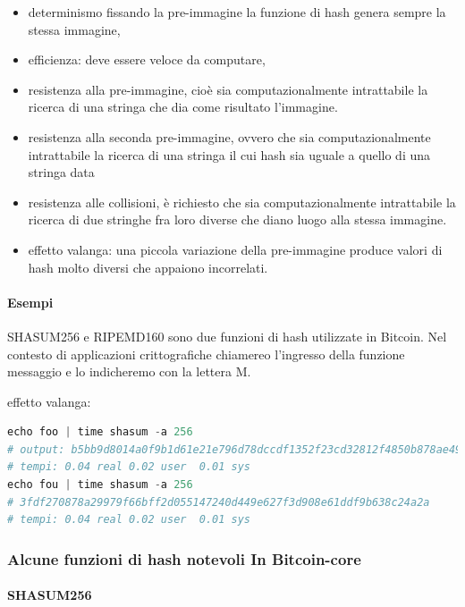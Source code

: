 \documentclass{book}
\theoremstyle{definition}
\begin{document}
\begin{itemize}
    \item determinismo fissando la pre-immagine la funzione di hash genera sempre la stessa immagine,
    \item efficienza: deve essere veloce da computare,
    \item resistenza alla pre-immagine, cioè sia computazionalmente intrattabile la ricerca di una stringa che dia come risultato l'immagine.
    \item resistenza alla seconda pre-immagine, ovvero che sia computazionalmente intrattabile la ricerca di una stringa il cui hash sia uguale a quello di una stringa data
    \item resistenza alle collisioni, è richiesto che sia computazionalmente intrattabile la ricerca di due stringhe fra loro diverse che diano luogo alla stessa immagine.
    \item effetto valanga: una piccola variazione della pre-immagine produce valori di hash molto diversi che appaiono incorrelati.
\end{itemize}

\paragraph{Esempi}

SHASUM256 e RIPEMD160 sono due funzioni di hash utilizzate in Bitcoin.
Nel contesto di applicazioni crittografiche chiamereo l'ingresso della funzione messaggio e lo indicheremo con la lettera M.

effetto valanga:

\begin{lstlisting}[language=Python]
echo foo | time shasum -a 256
# output: b5bb9d8014a0f9b1d61e21e796d78dccdf1352f23cd32812f4850b878ae4944c
# tempi: 0.04 real 0.02 user  0.01 sys
echo fou | time shasum -a 256
# 3fdf270878a29979f66bff2d055147240d449e627f3d908e61ddf9b638c24a2a
# tempi: 0.04 real 0.02 user  0.01 sys
\end{lstlisting}

\subsubsection{Alcune funzioni di hash notevoli In Bitcoin-core}

\paragraph{SHASUM256}
\end{document}
